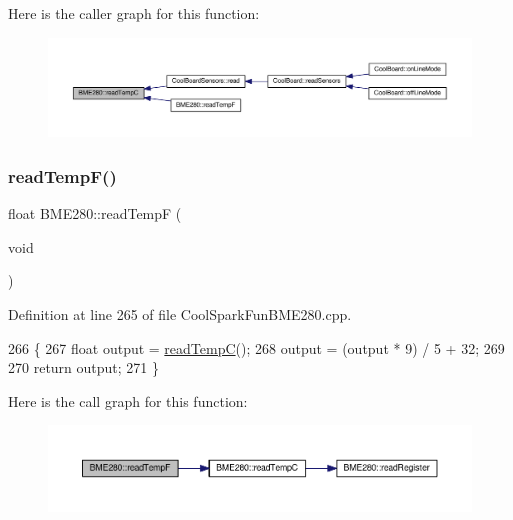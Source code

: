 Here is the caller graph for this function\+:\nopagebreak
\begin{figure}[H]
\begin{center}
\leavevmode
\includegraphics[width=350pt]{df/dcf/class_b_m_e280_afffdd1d7ded9e1f92200e70669019d97_icgraph}
\end{center}
\end{figure}
\mbox{\label{class_b_m_e280_a9648b496f6b4700550782a715a98b3c7}} 
\subsubsection{\texorpdfstring{read\+Temp\+F()}{readTempF()}}
{\footnotesize\ttfamily float B\+M\+E280\+::read\+TempF (\begin{DoxyParamCaption}\item[{void}]{ }\end{DoxyParamCaption})}



Definition at line 265 of file Cool\+Spark\+Fun\+B\+M\+E280.\+cpp.


\begin{DoxyCode}
266 \{
267     \textcolor{keywordtype}{float} output = \hyperlink{class_b_m_e280_afffdd1d7ded9e1f92200e70669019d97}{readTempC}();
268     output = (output * 9) / 5 + 32;
269 
270     \textcolor{keywordflow}{return} output;
271 \}
\end{DoxyCode}
Here is the call graph for this function\+:\nopagebreak
\begin{figure}[H]
\begin{center}
\leavevmode
\includegraphics[width=350pt]{df/dcf/class_b_m_e280_a9648b496f6b4700550782a715a98b3c7_cgraph}
\end{center}
\end{figure}
\mbox{\label{class_b_m_e280_aeec5deb6daace6ae390108b4210e9df7}} 
